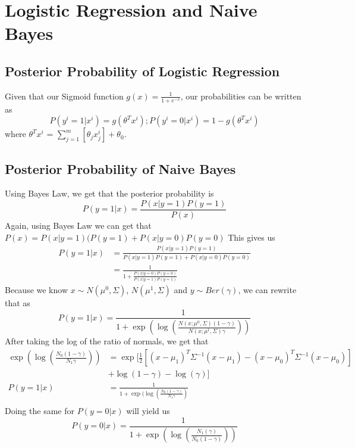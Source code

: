 \documentclass[pdftex,11pt]{article}
\begin{document}
\section{Logistic Regression and Naive Bayes}
\subsection{Posterior Probability of Logistic Regression}
Given that our Sigmoid function $g(x) = \frac{1}{1 + e^{-x}}$, our probabilities can be written as
$$P(y^i=1|x^i) = g(\theta^T x^i); P(y^i=0|x^i) = 1 - g(\theta^T x^i)$$ where $\theta^T x^i$  = $\sum_{j=1}^m [\theta_j x_j^i] + \theta_0$.
\subsection{Posterior Probability of Naive Bayes}
Using Bayes Law, we get that the posterior probability is 
$$P(y = 1|x) = \frac{P(x|y=1)P(y=1)}{P(x)}$$
Again, using Bayes Law we can get that $P(x) = P(x|y=1)(P(y=1) + P(x|y=0)P(y=0)$ This gives us
\begin{align*}
P(y=1|x) &= \frac{P(x|y=1)P(y=1)}{P(x|y=1)P(y=1) + P(x|y=0)P(y=0)}\\
&= \frac{1}{1 + \frac{P(x|y=0)P(y=0)}{P(x|y=1)P(y=1)}}
\end{align*}
Because we know  $x \sim N(\mu^0, \Sigma)$, $N(\mu^1, \Sigma)$ and $y \sim Ber(\gamma)$, we can rewrite that as
$$P(y=1|x) = \frac{1}{1 + \exp(\log(\frac{N(x; \mu^0, \Sigma) (1-\gamma)}{N(x; \mu^1,\Sigma)\gamma}))}$$
After taking the log of the ratio of normals, we get that
\begin{align*}
\exp(\log(\frac{N_0(1-\gamma)}{N_1\gamma})) &= \exp[\frac{1}{2}[(x-\mu_1)^T\Sigma^{-1}(x-\mu_1) - (x-\mu_0)^T\Sigma^{-1}(x-\mu_0)] \\&+ \log(1-\gamma) - \log(\gamma)]\\
P(y=1|x) &= \frac{1}{1+\exp(\log(\frac{N_0(1-\gamma)}{N_1\gamma})}\\
\end{align*}
Doing the same for $P(y=0|x)$ will yield us 
$$P(y=0|x) = \frac{1}{1 + \exp(\log(\frac{N_1 (\gamma)}{N_0(1-\gamma)}))}$$
\end{document}
